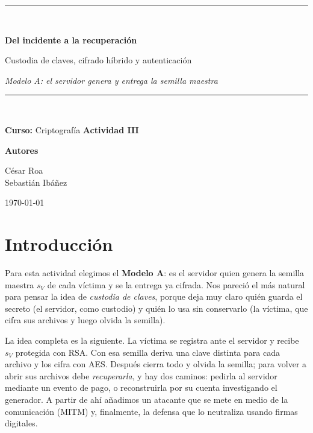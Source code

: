 \documentclass[11pt,a4paper]{article}
\begin{document}
\begin{titlepage}
\centering
\vspace*{1.6cm}
{\color{azulUNI}\rule{\linewidth}{1.2pt}}\\[0.6cm]
{\LARGE\bfseries Del incidente a la recuperación\par}
\vspace{0.3cm}
{\Large Custodia de claves, cifrado híbrido y autenticación\par}
\vspace{0.2cm}
{\large\itshape Modelo A: el servidor genera y entrega la semilla maestra\par}
\vspace{0.4cm}
{\color{azulUNI}\rule{\linewidth}{1.2pt}}\\[1.2cm]

{\large\textbf{Curso:} Criptografía \quad\textbar\quad \textbf{Actividad III}\par}
\vspace{1.4cm}
{\large\textbf{Autores}\par}
\vspace{0.3cm}
{\large César Roa \\[0.2cm] Sebastián Ibáñez\par}

\vfill
{\large \today\par}
\end{titlepage}

\section{Introducción}

Para esta actividad elegimos el \textbf{Modelo A}: es el servidor quien genera la
semilla maestra $s_V$ de cada víctima y se la entrega ya cifrada. Nos pareció el
más natural para pensar la idea de \emph{custodia de claves}, porque deja muy
claro quién guarda el secreto (el servidor, como custodio) y quién lo usa sin
conservarlo (la víctima, que cifra sus archivos y luego olvida la semilla).

La idea completa es la siguiente. La víctima se registra ante el servidor y
recibe $s_V$ protegida con RSA. Con esa semilla deriva una clave distinta para
cada archivo y los cifra con AES. Después cierra todo y olvida la semilla; para
volver a abrir sus archivos debe \emph{recuperarla}, y hay dos caminos: pedirla al
servidor mediante un evento de pago, o reconstruirla por su cuenta investigando
el generador. A partir de ahí añadimos un atacante que se mete en medio de la
comunicación (MITM) y, finalmente, la defensa que lo neutraliza usando firmas
digitales.
\end{document}
